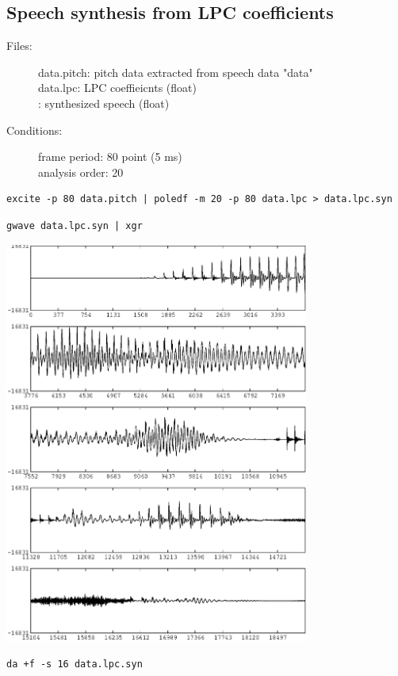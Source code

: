 \documentclass[a4paper]{article}
\begin{document}
\subsection{Speech synthesis from LPC coefficients}

\begin{description}
\item[Files:]
   data.pitch: pitch data extracted from speech data "data"\\
   data.lpc: LPC coeffieicnts (float)\\
   : 
   synthesized speech (float)
\item[Conditions:]
  frame period: 80 point (5 ms)\\
  analysis order: 20
\end{description}

\begin{verbatim}
excite -p 80 data.pitch | poledf -m 20 -p 80 data.lpc > data.lpc.syn
\end{verbatim}

\begin{verbatim}
gwave data.lpc.syn | xgr
\end{verbatim}

\includegraphics[width=10cm]{data.lpc.syn.gwave.eps}

\begin{verbatim}
da +f -s 16 data.lpc.syn
\end{verbatim}
\end{document}
